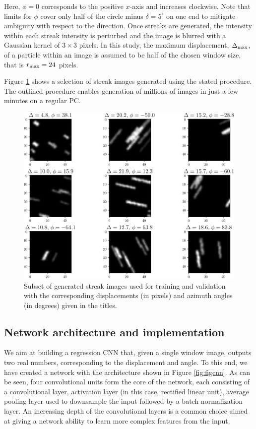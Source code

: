 \documentclass{svjour3}                     %
\begin{document}
Here, $\phi = 0$ corresponds to the positive $x$-axis and increases clockwise. 
Note that limits for $\phi$ cover only half of the circle minus $\delta = 5^{\circ}$ on one end to mitigate ambiguity with respect to the direction. Once streaks are generated, the intensity within each streak intensity is perturbed and the image is blurred with a Gaussian kernel of $3\times 3$ pixels. In this study, the maximum displacement, $\Delta_\textnormal{max}$, of a particle within an image is assumed to be half of the chosen window size, that is $r_\textnormal{max} = 24$ pixels. 

Figure \ref{fig:fig1} shows a selection of streak images generated using the stated procedure. The outlined procedure enables generation of millions of images in just a few minutes on a regular PC. 

\begin{figure}
\includegraphics[width=\textwidth]{figs/figure1.png}
\caption{Subset of generated streak images used for training and validation with the corresponding displacements (in pixels) and azimuth angles (in degrees) given in the titles.}
\label{fig:fig1}
\end{figure}

\subsection{Network architecture and implementation}

We aim at building a regression CNN that, given a single window image, outputs two real numbers, corresponding to the displacement and angle. To this end, we have created a network with the architecture shown in Figure \ref{fig:figcnn}. As can be seen, four convolutional units form the core of the network, each consisting of a convolutional layer, activation layer (in this case, rectified linear unit), average pooling layer used to downsample the input followed by a batch normalization layer. An increasing depth of the convolutional layers is a common choice aimed at giving a network ability to learn more complex features from the input. 
\end{document}
